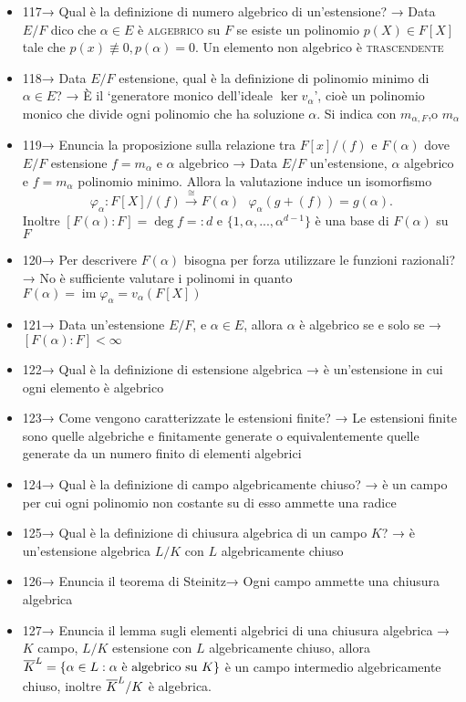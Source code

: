 \documentclass[A4,12pt]{article}
\begin{document}
\begin{itemize}[noitemsep]
		\item 117→ Qual è la definizione di numero algebrico di un'estensione? → Data $ E/F $ dico che $ \alpha \in E $ è \textsc{algebrico } su $ F $ se esiste un polinomio $ p(X)\in F[X] $ tale che $ p(x)\not \equiv 0, p(\alpha) = 0 $. Un elemento non algebrico è \textsc{trascendente}
		\item 118→ Data $ E/F $ estensione, qual è la definizione di polinomio minimo di $ \alpha \in E $? → È il \enquote*{generatore monico dell'ideale $ \ker v_\alpha $}, cioè un polinomio monico che divide ogni polinomio che ha soluzione $ \alpha $. Si indica con $ m_{\alpha,F}$,o $m_\alpha  $
		\item 119→ Enuncia la proposizione sulla relazione tra $ F[x]/(f) $ e $ F(\alpha) $ dove $ E/F $ estensione $ f = m_\alpha $ e $ \alpha $ algebrico → Data $ E/F $ un'estensione, $ \alpha $ algebrico e $ f=m_\alpha $ polinomio minimo. Allora la valutazione induce un isomorfismo \[ \varphi_\alpha: F[X]/(f) \overset{\cong}{\longrightarrow} F(\alpha)\ \ \  \varphi_\alpha (g+(f)) =g(\alpha). \] Inoltre $ [F(\alpha):F] = \deg f =:d$ e $ \{1,\alpha,...,\alpha^{d-1}\} $ è una base di $ F(\alpha) $ su $ F $ 
		\item 120→ Per descrivere $ F(\alpha) $ bisogna per forza utilizzare le funzioni razionali? → No è sufficiente valutare i polinomi in quanto $ F(\alpha) = \operatorname{im} \varphi_\alpha = v_\alpha (F[X])$
		\item 121→ Data un'estensione $E/F$, e $\alpha \in E$, allora $\alpha $ è algebrico se e solo se → $[F(\alpha):F]<\infty$ 
		\item 122→ Qual è la definizione di estensione algebrica → è un'estensione in cui ogni elemento è algebrico
		\item 123→ Come vengono caratterizzate le estensioni finite? → Le estensioni finite sono quelle algebriche e finitamente generate o equivalentemente quelle generate da un numero finito di elementi algebrici
		\item 124→ Qual è la definizione di campo algebricamente chiuso? → è un campo per cui ogni polinomio non costante su di esso ammette una radice
		\item 125→ Qual è la definizione di chiusura algebrica di un campo $K$? → è un'estensione algebrica $L/K$ con $L$ algebricamente chiuso
		\item 126→ Enuncia il teorema di Steinitz→ Ogni campo ammette una chiusura algebrica
		\item 127→ Enuncia il lemma sugli elementi algebrici di una chiusura algebrica → $K$ campo, $L/K$ estensione con $L$ algebricamente chiuso, allora $\overline{K}\strut^{L} = \{\alpha \in L: \alpha \text{ è algebrico su } K\}$ è un campo intermedio algebricamente chiuso, inoltre $ \overline{K}\strut^{L}/K $ è algebrica.

\end{itemize}
\end{document}
